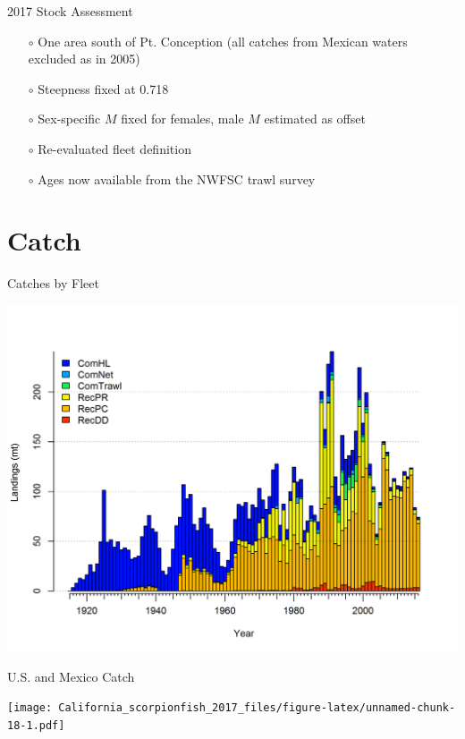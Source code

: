 \documentclass[ignorenonframetext,compress]{beamer}
\begin{document}
\begin{frame}{2017 Stock Assessment}

\begin{itemize}
\item[$\circ$] One area south of Pt. Conception (all catches from Mexican waters excluded as in 2005)
\item[$\circ$] Steepness fixed at 0.718
\item[$\circ$] Sex-specific $M$ fixed for females, male $M$ estimated as offset
\item[$\circ$] Re-evaluated fleet definition
\item[$\circ$] Ages now available from the NWFSC trawl survey
\end{itemize}

\end{frame}

\section{Catch}\label{catch}

\begin{frame}{Catches by Fleet}

\centering
\includegraphics{r4ss/plots_mod1/catch2 landings stacked.png}

\end{frame}

\begin{frame}{U.S. and Mexico Catch}

\texttt{[image: California\_scorpionfish\_2017\_files/figure-latex/unnamed-chunk-18-1.pdf]}

\end{frame}
\end{document}

